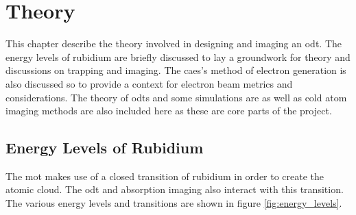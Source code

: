 \chapter{Theory}

This chapter describe the theory involved in designing and imaging an \gls{odt}. The energy levels of rubidium are briefly discussed to lay a groundwork for theory and discussions on trapping and imaging. The \gls{caes}'s method of electron generation is also discussed so to provide a context for electron beam metrics and considerations. The theory of \glspl{odt} and some simulations are as well as cold atom imaging methods are also included here as these are core parts of the project.

\section{Energy Levels of Rubidium}

The \gls{mot} makes use of a closed transition of rubidium in order to create the atomic cloud. The \gls{odt} and absorption imaging also interact with this transition. The various energy levels and transitions are shown in figure \ref{fig:energy_levels}.

